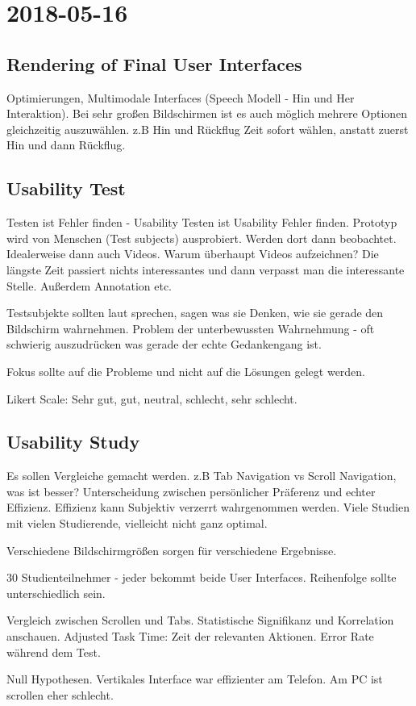 \section{2018-05-16}

\subsection{Rendering of Final User Interfaces}

Optimierungen, Multimodale Interfaces (Speech Modell - Hin und Her Interaktion).
Bei sehr großen Bildschirmen ist es auch möglich mehrere Optionen gleichzeitig
auszuwählen. z.B Hin und Rückflug Zeit sofort wählen, anstatt zuerst Hin und dann Rückflug.

\subsection{Usability Test}

Testen ist Fehler finden - Usability Testen ist Usability Fehler finden. Prototyp wird von
Menschen (Test subjects) ausprobiert. Werden dort dann beobachtet. Idealerweise dann
auch Videos. 
Warum überhaupt Videos aufzeichnen? Die längste Zeit passiert nichts interessantes und
dann verpasst man die interessante Stelle. Außerdem Annotation etc.

Testsubjekte sollten laut sprechen, sagen was sie Denken, wie sie gerade den Bildschirm
wahrnehmen. Problem der unterbewussten Wahrnehmung - oft schwierig auszudrücken was
gerade der echte Gedankengang ist.

Fokus sollte auf die Probleme und nicht auf die Lösungen gelegt werden.

Likert Scale: Sehr gut, gut, neutral, schlecht, sehr schlecht.

\subsection{Usability Study}
Es sollen Vergleiche gemacht werden. z.B Tab Navigation vs Scroll Navigation, was ist
besser? Unterscheidung zwischen persönlicher Präferenz und echter Effizienz. Effizienz
kann Subjektiv verzerrt wahrgenommen werden.
Viele Studien mit vielen Studierende, vielleicht nicht ganz optimal.

Verschiedene Bildschirmgrößen sorgen für verschiedene Ergebnisse. 

30 Studienteilnehmer - jeder bekommt beide User Interfaces. Reihenfolge sollte
unterschiedlich sein.

Vergleich zwischen Scrollen und Tabs. Statistische Signifikanz und Korrelation anschauen.
Adjusted Task Time: Zeit der relevanten Aktionen. Error Rate während dem Test.

Null Hypothesen. Vertikales Interface war effizienter am Telefon. Am PC ist scrollen eher
schlecht.





